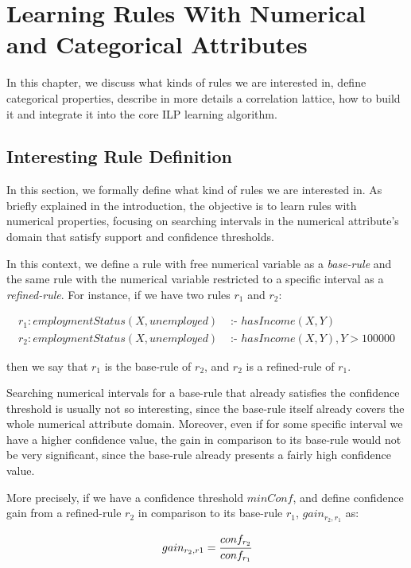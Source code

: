 \chapter{Learning Rules With Numerical and Categorical Attributes}
\label{cl:intro}

In this chapter, we discuss what kinds of rules we are interested in, define categorical properties,
describe in more details a correlation lattice, how to build it and integrate it into the core ILP learning
algorithm.

\section{Interesting Rule Definition}

In this section, we formally define what kind of rules we are interested in. As briefly explained in the introduction,
the objective is to learn rules with numerical properties, focusing on searching intervals in the numerical attribute's
domain that satisfy support and confidence thresholds.

In this context, we define a rule with free numerical variable as a \emph{base-rule} and the same rule with the
numerical variable restricted to a specific interval as a \emph{refined-rule}. For instance, if we have
two rules $r_1$ and $r_2$:

\begin{align*}
r_1: employmentStatus(X,unemployed)&\text{ :- }hasIncome(X,Y) \\
r_2: employmentStatus(X,unemployed)&\text{ :- }hasIncome(X,Y),Y>100000
\end{align*}

then we say that $r_1$ is the base-rule of $r_2$, and $r_2$ is a refined-rule of $r_1$.

Searching numerical intervals for a base-rule that already satisfies the confidence threshold is usually not so
interesting, since the base-rule itself already covers the whole numerical attribute
domain. Moreover, even if for some specific interval we have a higher confidence value, the gain in comparison to
its base-rule would not be very significant, since the base-rule already presents a fairly high confidence value.

More precisely, if we have a confidence threshold $minConf$, and define confidence gain from a refined-rule
$r_2$ in comparison to its base-rule $r_1$, $gain_{r_2,r_1}$ as:

\begin{equation}
 gain_{r_2,r1}=\cfrac{conf_{r_2}}{conf_{r_1}}
\end{equation}

